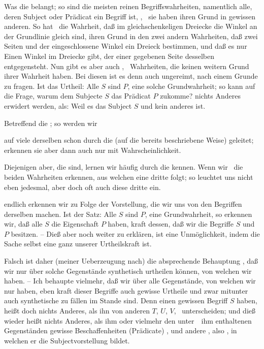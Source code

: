 \begin{aufza}
\begin{aufzb}
\begin{aufzc}
\item Was die  belangt; so sind die meisten reinen Begriffswahrheiten, namentlich alle, deren Subject oder Prädicat ein  Begriff ist, , \dh\ sie haben ihren Grund in gewissen anderen. So hat \zB\ die Wahrheit, daß im gleichschenkeligen Dreiecke die Winkel an der Grundlinie gleich sind, ihren Grund in den zwei andern Wahrheiten, daß zwei Seiten und der eingeschlossene Winkel ein Dreieck bestimmen, und daß es nur Einen Winkel im Dreiecke gibt, der einer gegebenen Seite desselben entgegensteht. Nun gibt es aber auch , \dh\ Wahrheiten, die keinen weitern Grund ihrer Wahrheit haben. Bei diesen ist es denn auch ungereimt, nach einem Grunde zu fragen. Ist das Urtheil: Alle $S$ sind $P$, eine solche Grundwahrheit; so kann auf die Frage, warum dem Subjecte $S$ das Prädicat $P$ zukomme? nichts Anderes erwidert werden, als: Weil es das Subject $S$ und kein anderes ist.
\item Betreffend die ; so werden wir
\begin{aufzb}[a.]
\item auf viele derselben schon durch die  (auf die bereits beschriebene Weise) geleitet; erkennen sie aber dann auch nur mit Wahrscheinlichkeit.
\item Diejenigen aber, die  sind, lernen wir häufig durch die  kennen. Wenn wir \zB\ die beiden Wahrheiten erkennen, aus welchen eine dritte folgt; so leuchtet uns nicht eben jedesmal, aber doch oft auch diese dritte ein.
\item {} endlich erkennen wir zu Folge der Vorstellung, die wir uns von den Begriffen derselben machen. Ist der Satz: Alle $S$ sind $P$, eine Grundwahrheit, so erkennen wir, daß alle $S$ die Eigenschaft $P$ haben, kraft dessen, daß wir die Begriffe $S$ und $P$ besitzen. -- Dieß aber noch weiter zu erklären, ist eine Unmöglichkeit, indem die Sache selbst eine ganz  unserer Urtheilskraft ist.
\end{aufzb}
\end{aufzc}
\end{aufzb}
\item Falsch ist daher (meiner Ueberzeugung nach) die absprechende Behauptung , daß wir nur über solche Gegenstände synthetisch urtheilen können, von welchen wir  haben. -- Ich behaupte vielmehr, daß wir über alle Gegenstände, von welchen wir nur  haben, eben kraft dieser Begriffe auch gewisse Urtheile und zwar mitunter auch synthetische zu fällen im Stande sind. Denn einen gewissen Begriff $S$ haben, heißt doch nichts Anderes, als ihn von anderen $T$, $U$, $V$, \textsymmdots\ unterscheiden; und dieß wieder heißt nichts Anderes, als ihm oder vielmehr den unter~\ ihm enthaltenen Gegenständen gewisse Beschaffenheiten (Prädicate) , und andere , also , in welchen er die Subjectvorstellung bildet.

\end{aufza}

